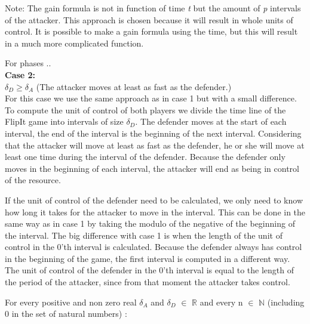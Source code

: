 Note: The gain formula is not in function of time \textit{t }but the amount of \textit{p} intervals of the attacker. This approach is chosen because it will result in whole units of control. It is possible to make a gain formula using the time, but this will result in a much more complicated function. 



For phases .. \\

\textbf{Case  2:} \\
$\delta_{D} \geq \delta_{A}$ (The attacker moves at least as fast as the defender.) \\

For this case we use the same approach as in case 1 but with a small difference. To compute the unit of control of both players we divide the time line of the FlipIt game into intervals of size $\delta_{D}$.  The defender moves at the start of each interval, the end of the interval is the beginning of the next interval. Considering that the attacker will move at least as fast as the defender, he or she will move at least one time during the interval of the defender. Because the defender only moves in the beginning of each interval, the attacker will end as being in control of the resource.

If the unit of control of the defender need to be calculated, we only need to know how long it takes for the attacker to move in the interval. This can be done in the same way as in case 1 by taking the modulo of the negative of the beginning of the interval. The big difference with case 1 is when the length of the unit of control in the 0'th interval is calculated. Because the defender always has control in the beginning of the game, the first interval is computed in a different way. The unit of control of the defender in the 0'th interval is equal to the length of the period of the attacker, since from that moment the attacker takes control.

For every positive and non zero real $\delta_{A}$ and $\delta_{D}$ $\in$ \(\mathbb{R}\) and every n $\in$ \(\mathbb{N}\) (including 0 in the set of natural numbers) :\\


